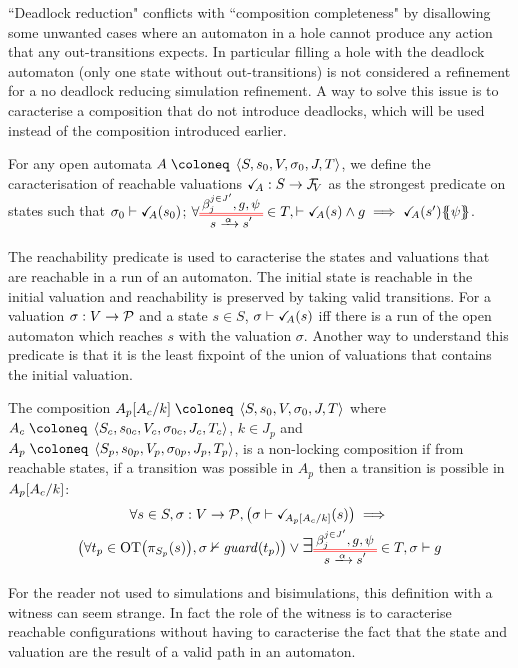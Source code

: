 \documentclass{article}
\begin{document}
``Deadlock reduction" conflicts with ``composition completeness" by disallowing some unwanted cases where an automaton in a hole cannot produce any action that any out-transitions expects.
In particular filling a hole with the deadlock automaton (only one state without out-transitions) is not considered a refinement for a no deadlock reducing simulation refinement.
A way to solve this issue is to caracterise a composition that do not introduce deadlocks, which will be used instead of the composition introduced earlier.
\begin{defi}[Reachability]
For any open automata \(A \defobject \OA{S}{s_0}{V}{\sigma_0}{J}{T}\), we define the caracterisation of reachable valuations \(\reach{A}: S \to \rformulae[V]\) as the strongest predicate on states such that
 \(\sigma_0 \vdash \reach{A}\mpar{s_0}\);
 \(\forall \OTg \in T, \vdash \reach{A}\mpar{s} \wedge g \implies \reach{A}\mpar{s'}\psubst{\psi}\).
\end{defi}
The reachability predicate is used to caracterise the states and valuations that are reachable in a run of an automaton.
The initial state is reachable in the initial valuation and reachability is preserved by taking valid transitions.
For a valuation \(\sigma: V \to \values\) and a state \(s \in S\), \(\sigma \vdash \reach{A}\mpar{s}\) iff there is a run of the open automaton which reaches \(s\) with the valuation \(\sigma\).
Another way to understand this predicate is that it is the least fixpoint of the union of valuations that contains the initial valuation.
\begin{defi}
The composition \(A_p\subst{A_c}{k} \defobject \OA{S}{s_0}{V}{\sigma_0}{J}{T}\) where \(A_c \defobject \OA{S_c}{s_{0c}}{V_c}{\sigma_{0c}}{J_c}{T_c}\), \(k \in J_p\) and \(A_p \defobject \OA{S_p}{s_{0p}}{V_p}{\sigma_{0p}}{J_p}{T_p}\), is a non-locking composition if from reachable states, if a transition was possible in \(A_p\) then a transition is possible in \(A_p\subst{A_c}{k}\):
\begin{multline*}
	\forall s \in S, \sigma: V \to \values, \mpar{\sigma \vdash \reach{A_p\subst{A_c}{k}}\mpar{s}} \implies \\
	\mpar{\forall t_p \in \fOT{\pi_{S_p}\mpar{s}}, \sigma \nvdash \fguard{t_p}} \vee \bigsymb{\exists} \OTg \in T, \sigma \vdash g
\end{multline*}
\end{defi}
For the reader not used to simulations and bisimulations, this definition with a witness can seem strange.
In fact the role of the witness is to caracterise reachable configurations without having to caracterise the fact that the state and valuation are the result of a valid path in an automaton.
\end{document}
